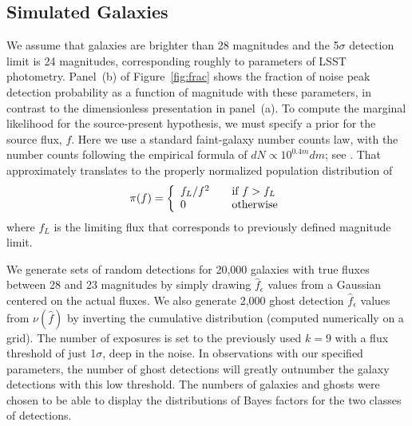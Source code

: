 \documentclass[twocolumn]{emulateapj}
\newcommand{\eind}{\epsilon}  %
\newcommand{\flux}{f}
\newcommand{\fest}{\hat{\flux}}  %
\newcommand{\npd}{\nu}  %
\begin{document}
\subsection{Simulated Galaxies}
\noindent
We assume that galaxies are brighter than 28 magnitudes and the 5$\sigma$ detection limit is 24 magnitudes, corresponding roughly to parameters of LSST photometry.
%
Panel~(b) of Figure~\ref{fig:frac} shows the fraction of noise peak detection probability as a function of magnitude with these parameters, in contrast to the dimensionless presentation in panel~(a).
%
To compute the marginal likelihood for the source-present hypothesis, we must specify a prior for the source flux, $\flux$.
Here we use a standard faint-galaxy number counts law,
with the number counts following the empirical formula of 
\mbox{$dN\!\propto\!10^{0.4m}dm$}; see \citep{MT00-NumCounts}. 
That approximately translates to the properly normalized population distribution of
%
\begin{equation} 
\label{eq:ref3}
\pi(f) = \left\{\begin{array}{l l}
           f_L/f^2  & \quad \mbox{if\ $f > f_L$}\\
           0 & \quad \mbox{otherwise}
           \\ \end{array} \right.
\end{equation}
%
where $f_L$ is the limiting flux that corresponds to previously defined magnitude limit.

We generate sets of random detections for 20,000 galaxies with true fluxes between 28 and 23 magnitudes by simply drawing $\fest_\eind$ values from a Gaussian centered on the actual fluxes.
%
We also generate 2,000 ghost detection $\fest_\eind$ values from $\npd(\fest)$ by inverting the cumulative distribution (computed numerically on a grid).
%
The number of exposures is set to the previously used $k=9$ with a flux threshold of just 1$\sigma$, deep in the noise.
In observations with our specified parameters, the number of ghost detections will greatly outnumber the galaxy detections with this low threshold.
The numbers of galaxies and ghosts were chosen to be able to display the distributions of Bayes factors for the two classes of detections.
\end{document}

